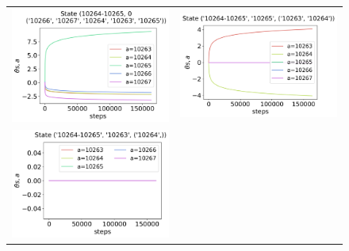 \begin{figure}[!htp]
    \centering
    \begin{tabular}{cc}
        \includegraphics[scale=0.36,valign=b]{chapters/figures/theta_PG_state_0.png} &
        \includegraphics[scale=0.36,valign=b]{chapters/figures/theta_PG_state_1.png} \\
        \hspace*{-10pt}\includegraphics[scale=0.36,valign=b]{chapters/figures/theta_PG_state_2.png} &

\end{tabular}
\end{figure}
